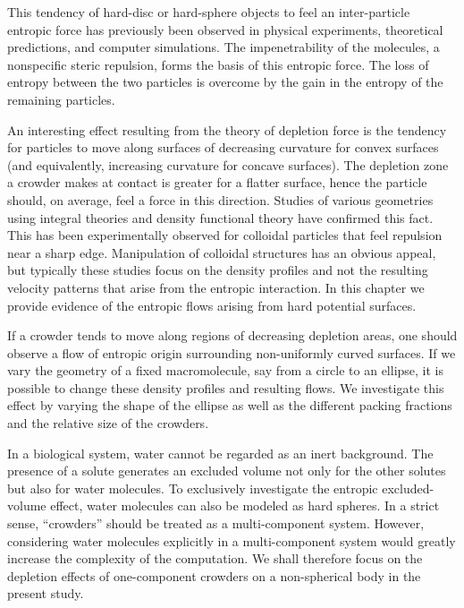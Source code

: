 This tendency of hard-disc or hard-sphere objects to feel an inter-particle entropic force has previously been observed in physical experiments,\cite{crocker_entropic_1999, ohshima_direct_1997} theoretical predictions,\cite{tehver_depletion_1999, mao_depletion_1995} and computer simulations.\cite{biben_depletion_1996} The impenetrability of the molecules, a nonspecific steric repulsion, forms the basis of this entropic force. The loss of entropy between the two particles is overcome by the gain in the entropy of the remaining particles. 

An interesting effect resulting from the theory of depletion force is the tendency for particles to move along surfaces of decreasing curvature for convex surfaces (and equivalently, increasing curvature for concave surfaces). The depletion zone a crowder makes at contact is greater for a flatter surface, hence the particle should, on average, feel a force in this direction. Studies of various geometries using integral theories\cite{kinoshita_interaction_2004, kinoshita_spatial_2002} and density functional theory\cite{roth_depletion_1999, roth_depletion_2000} have confirmed this fact. This has been experimentally observed for colloidal particles that feel repulsion near a sharp edge.\cite{dinsmore_entropic_1996} Manipulation of colloidal structures has an obvious appeal, but typically these studies focus on the density profiles and not the resulting velocity patterns that arise from the entropic interaction. In this chapter we provide evidence of the entropic flows arising from hard potential surfaces.

If a crowder tends to move along regions of decreasing depletion areas, one should observe a flow of entropic origin surrounding non-uniformly curved surfaces. If we vary the geometry of a fixed macromolecule, say from a circle to an ellipse, it is possible to change these density profiles and resulting flows.  We investigate this effect by varying the shape of the ellipse as well as the different packing fractions and the relative size of the crowders. 

In a biological system, water cannot be regarded as an inert background.\cite{kinoshita_roles_2006} The presence of a solute generates an excluded volume not only for the other solutes but also for water molecules. To exclusively investigate the entropic excluded-volume effect, water molecules can also be modeled as hard spheres. In a strict sense, ``crowders'' should be treated as a multi-component system.\cite{akiyama_remarkable_2006} However, considering water molecules explicitly in a multi-component system would greatly increase the complexity of the computation. We shall therefore focus on the depletion effects of one-component crowders on a non-spherical body in the present study.

